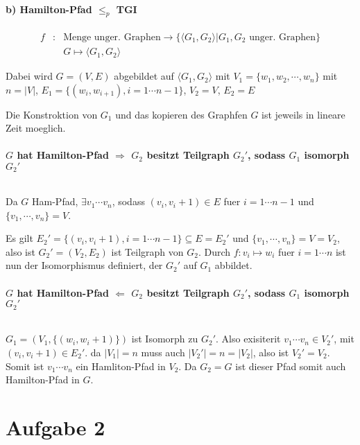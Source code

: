 \paragraph{b) Hamilton-Pfad $\leq_p$ TGI}

\begin{eqnarray}
f &:& \text{Menge unger. Graphen} \to \{\langle G_1, G_2 \rangle | \text{$G_1, G_2$ unger. Graphen}\}\\
  & & G \mapsto \langle G_1, G_2 \rangle
\end{eqnarray}

Dabei wird $G = (V,E)$ abgebildet auf $\langle G_1, G_2 \rangle$ mit
$V_1 = \{w_1,w_2, \cdots, w_n\}$ mit $n=|V|$, $E_1 = \{(w_i, w_{i+1}), i=1\cdots n-1\}$, $V_2 = V$, $E_2 = E$

Die Konstroktion von $G_1$ und das kopieren des Graphfen $G$ ist jeweils in lineare Zeit moeglich.

\paragraph{$G$ hat Hamilton-Pfad $\Rightarrow$ $G_2$ besitzt Teilgraph $G_2'$, sodass $G_1$ isomorph $G_2'$} $ $ 

Da $G$ Ham-Pfad, $\exists v_1 \cdots v_n$, sodass $(v_i, v_i+1) \in E$ fuer $i=1\cdots n-1$
und $\{v_1, \cdots, v_n\} = V$. 

Es gilt $E_2' = \{(v_i, v_i+1), i = 1 \cdots n-1\} \subseteq E = E_2'$ und $\{v_1, \cdots, v_n\} = V = V_2$,
also ist $G_2' = (V_2, E_2)$ ist Teilgraph von $G_2$. Durch $f: v_i \mapsto w_i$ fuer $i=1\cdots n$
ist nun der Isomorphismus definiert, der $G_2'$ auf $G_1$ abbildet.

\paragraph{$G$ hat Hamilton-Pfad $\Leftarrow$ $G_2$ besitzt Teilgraph $G_2'$, sodass $G_1$ isomorph $G_2'$} $ $ 

$G_1 = (V_1, \{(w_i, w_i+1) \})$ ist Isomorph zu $G_2'$. Also exisiterit $v_1 \cdots v_n \in V_2'$,
    mit $(v_i, v_i+1) \in E_2'$. da $|V_1| = n$ muss auch $|V_2'| = n = |V_2|$, also ist $V_2' = V_2$.
    Somit ist $v_1 \cdots v_n$ ein Hamliton-Pfad in $V_2$. Da $G_2 = G$ ist dieser Pfad somit auch Hamilton-Pfad 
    in $G$.

\section*{Aufgabe 2}
